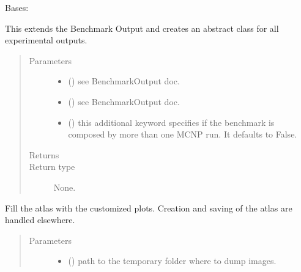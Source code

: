 \documentclass[letterpaper,10pt,english]{sphinxmanual}
\begin{document}
\begin{fulllineitems}
\label{\detokenize{api/postprocessing:expoutput.ExperimentalOutput}}
Bases: {\hyperref[\detokenize{api/postprocessing:output.BenchmarkOutput}]{}}

This extends the Benchmark Output and creates an abstract class
for all experimental outputs.
\begin{quote}\begin{description}
\item[{Parameters}] \leavevmode\begin{itemize}
\item {} 
 () \textendash{} see BenchmarkOutput doc.

\item {} 
 () \textendash{} see BenchmarkOutput doc.

\item {} 
 () \textendash{} this additional keyword specifies if the benchmark is composed
by more than one MCNP run. It defaults to False.

\end{itemize}

\item[{Returns}] \leavevmode


\item[{Return type}] \leavevmode
None.

\end{description}\end{quote}

\begin{fulllineitems}
\label{\detokenize{api/postprocessing:expoutput.ExperimentalOutput._build_atlas}}
Fill the atlas with the customized plots. Creation and saving of the
atlas are handled elsewhere.
\begin{quote}\begin{description}
\item[{Parameters}] \leavevmode\begin{itemize}
\item {} 
 () \textendash{} path to the temporary folder where to dump images.


\end{itemize}
\end{description}
\end{quote}
\end{fulllineitems}
\end{fulllineitems}
\end{document}
